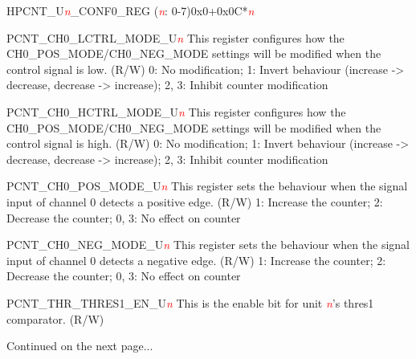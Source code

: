 \begin{register}{H}{PCNT\_U\textit{\textcolor{red}{\it{n}}}\_CONF0\_REG (\textcolor{red}{\it{n}}: 0-7)}{0x0+0x0C*\textcolor{red}{\it{n}}}
\begin{regdesc}
\begin{reglist}
\item [PCNT\_CH0\_LCTRL\_MODE\_U\textcolor{red}{\it{n}}]This register configures how the CH0\_POS\_MODE/CH0\_NEG\_MODE settings will be modified when the control signal is low. (R/W) 0: No modification; 1: Invert behaviour (increase ->  decrease, decrease ->  increase); 2, 3: Inhibit counter modification
\item [PCNT\_CH0\_HCTRL\_MODE\_U\textcolor{red}{\it{n}}]This register configures how the CH0\_POS\_MODE/CH0\_NEG\_MODE settings will be modified when the control signal is high. (R/W) 0: No modification; 1: Invert behaviour (increase ->  decrease, decrease ->  increase); 2, 3: Inhibit counter modification
\item [PCNT\_CH0\_POS\_MODE\_U\textcolor{red}{\it{n}}]This register sets the behaviour when the signal input of channel 0 detects a positive edge. (R/W) 1: Increase the counter; 2: Decrease the counter; 0, 3: No effect on counter
\item [PCNT\_CH0\_NEG\_MODE\_U\textcolor{red}{\it{n}}]This register sets the behaviour when the signal input of channel 0 detects a negative edge. (R/W) 1: Increase the counter; 2: Decrease the counter; 0, 3: No effect on counter
\item [PCNT\_THR\_THRES1\_EN\_U\textcolor{red}{\it{n}}]This is the enable bit for unit \textcolor{red}{\it{n}}'s thres1 comparator. (R/W)
\item [Continued on the next page...]
\end{reglist}\end{regdesc}
\end{register}
\addtocounter{Regfloat}{-1}
